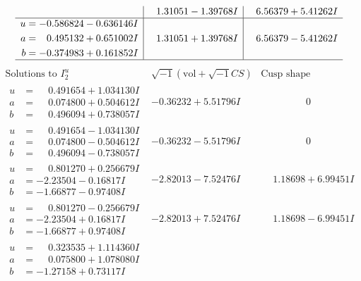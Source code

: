 \documentclass[1p]{elsarticle_modified}
\theoremstyle{definition}
\newcommand{\I}{\sqrt{-1}}
\begin{document}
$$\begin{array}{c|c|c}
 & \phantom{-}1.31051 - 1.39768 I & \phantom{-}6.56379 + 5.41262 I \\ \hline\begin{aligned}
u &= -0.586824 - 0.636146 I \\
a &= \phantom{-}0.495132 + 0.651002 I \\
b &= -0.374983 + 0.161852 I\end{aligned}
 & \phantom{-}1.31051 + 1.39768 I & \phantom{-}6.56379 - 5.41262 I\\
 \hline 
 \end{array}$$\newpage$$\begin{array}{c|c|c}  
\text{Solutions to }I^u_{2}& \I (\text{vol} + \sqrt{-1}CS) & \text{Cusp shape}\\
 \hline 
\begin{aligned}
u &= \phantom{-}0.491654 + 1.034130 I \\
a &= \phantom{-}0.074800 + 0.504612 I \\
b &= \phantom{-}0.496094 + 0.738057 I\end{aligned}
 & -0.36232 + 5.51796 I & \phantom{-0.000000 } 0 \\ \hline\begin{aligned}
u &= \phantom{-}0.491654 - 1.034130 I \\
a &= \phantom{-}0.074800 - 0.504612 I \\
b &= \phantom{-}0.496094 - 0.738057 I\end{aligned}
 & -0.36232 - 5.51796 I & \phantom{-0.000000 } 0 \\ \hline\begin{aligned}
u &= \phantom{-}0.801270 + 0.256679 I \\
a &= -2.23504 - 0.16817 I \\
b &= -1.66877 - 0.97408 I\end{aligned}
 & -2.82013 - 7.52476 I & \phantom{-}1.18698 + 6.99451 I \\ \hline\begin{aligned}
u &= \phantom{-}0.801270 - 0.256679 I \\
a &= -2.23504 + 0.16817 I \\
b &= -1.66877 + 0.97408 I\end{aligned}
 & -2.82013 + 7.52476 I & \phantom{-}1.18698 - 6.99451 I \\ \hline\begin{aligned}
u &= \phantom{-}0.323535 + 1.114360 I \\
a &= \phantom{-}0.075800 + 1.078080 I \\
b &= -1.27158 + 0.73117 I\end{aligned}

\end{array}$$
\end{document}

